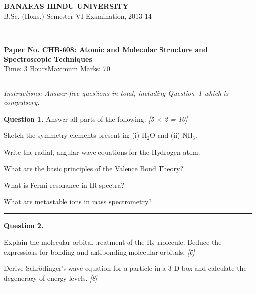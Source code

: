 \documentclass[11pt,a4paper]{article}
\newcommand{\pts}[1]{\hfill   \textit{[#1]}}
\begin{document}
\begin{center}
  {\large\bfseries BANARAS HINDU UNIVERSITY}\\[2pt]
  {\normalsize B.Sc. (Hons.) Semester VI Examination, 2013-14}\\[6pt]
  \rule{0.8\linewidth}{0.5pt}\\[6pt]
  {\large\bfseries Paper No. CHB-608: Atomic and Molecular Structure and Spectroscopic Techniques}\\[4pt]
  {\normalsize Time: 3 Hours\hfill Maximum Marks: 70}
\end{center}
\rule{\linewidth}{0.4pt}
\small



\noindent   \textit{Instructions: Answer five questions in total, including Question~1 which is compulsory.}

\normalsize
\bigskip




\noindent   \textbf{Question 1.} Answer all parts of the following: \pts{5 $ \times$ 2 = 10}

\begin{parts}
  \item Sketch the symmetry elements present in: (i) $ \text{H}_2 \text{O}$ and (ii) $ \text{NH}_3$.
  \item Write the radial, angular wave equations for the Hydrogen atom.
  \item What are the basic principles of the Valence Bond Theory?
  \item What is Fermi resonance in IR spectra?
  \item What are metastable ions in mass spectrometry?
\end{parts}

\medskip\rule{\linewidth}{0.2pt}




\noindent   \textbf{Question 2.}

\begin{parts}
  \item Explain the molecular orbital treatment of the $ \text{H}_2$ molecule. Deduce the expressions for bonding and antibonding molecular orbitals. \pts{6}
  \item Derive Schr\"odinger's wave equation for a particle in a $3$-D box and calculate the degeneracy of energy levels. \pts{8}
\end{parts}

\medskip\rule{\linewidth}{0.2pt}
\end{document}
